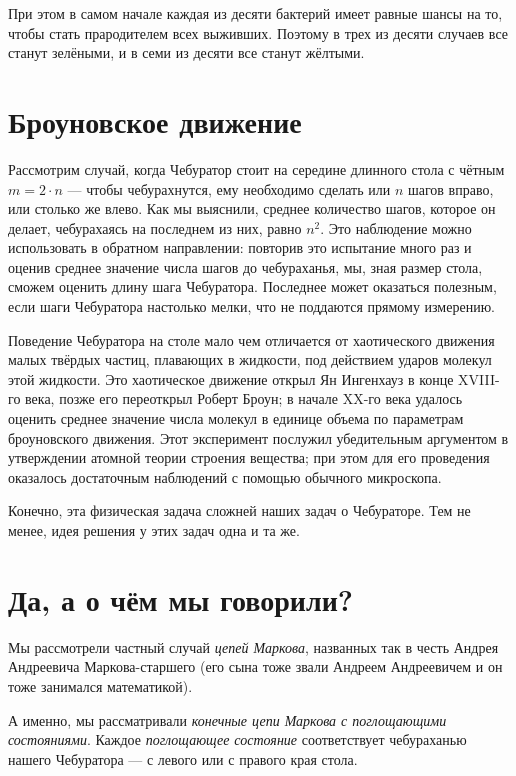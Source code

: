 \documentclass{article}
\begin{document}
При этом в самом начале каждая из десяти бактерий 
имеет равные шансы на то, чтобы стать прародителем всех выживших.
Поэтому в трех из десяти случаев все станут зелёными, 
и в семи из десяти все станут жёлтыми.


\section{Броуновское движение}

Рассмотрим случай, когда Чебуратор стоит на середине длинного стола с чётным $m=2\cdot n$ ---
чтобы чебурахнутся, ему необходимо сделать или $n$ шагов вправо, или столько же влево.
Как мы выяснили, среднее количество шагов, которое он делает, чебурахаясь на последнем из них, равно $n^2$. 
Это наблюдение можно использовать в обратном направлении:
повторив это испытание много раз и оценив среднее значение числа шагов до чебураханья, мы, 
зная размер стола, сможем оценить длину шага Чебуратора.
Последнее может оказаться полезным, если шаги Чебуратора настолько мелки, что не поддаются прямому измерению. 

Поведение Чебуратора на столе мало чем отличается 
от хаотического движения малых твёрдых частиц, плавающих в жидкости, под действием ударов молекул этой жидкости. 
Это хаотическое движение открыл Ян Ингенхауз в конце XVIII-го века,
позже его переоткрыл Роберт Броун;
в начале XX-го века удалось оценить
среднее значение числа молекул в единице объема по параметрам броуновского движения.
Этот эксперимент послужил убедительным аргументом в утверждении атомной теории строения вещества; при этом для его проведения оказалось достаточным
наблюдений с помощью обычного микроскопа.

Конечно, эта физическая задача сложней наших задач о Чебураторе.
Тем не менее, идея решения у этих задач одна и та же.



\section{Да, а о чём мы говорили?}

Мы рассмотрели частный случай \emph{цепей Маркова},
названных так в честь Андрея Андреевича Маркова-старшего (его сына тоже звали Андреем Андреевичем и он тоже занимался математикой).

А именно, мы рассматривали \emph{конечные цепи Маркова с поглощающими состояниями}.
Каждое \emph{поглощающее состояние} соответствует чебураханью нашего Чебуратора --- с левого или с правого края стола.
\end{document}
